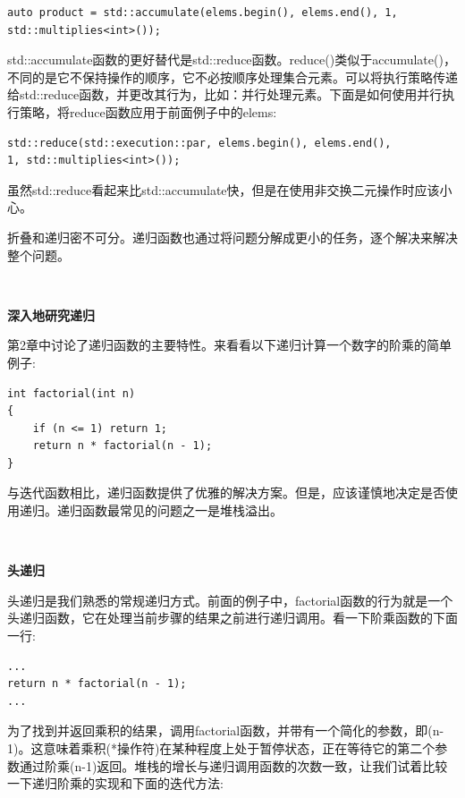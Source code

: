 \begin{lstlisting}[caption={}]
auto product = std::accumulate(elems.begin(), elems.end(), 1, std::multiplies<int>());
\end{lstlisting}

std::accumulate函数的更好替代是std::reduce函数。reduce()类似于accumulate()，不同的是它不保持操作的顺序，它不必按顺序处理集合元素。可以将执行策略传递给std::reduce函数，并更改其行为，比如：并行处理元素。下面是如何使用并行执行策略，将reduce函数应用于前面例子中的elems: \par

\begin{lstlisting}[caption={}]
std::reduce(std::execution::par, elems.begin(), elems.end(),
1, std::multiplies<int>());
\end{lstlisting}

虽然std::reduce看起来比std::accumulate快，但是在使用非交换二元操作时应该小心。 \par
折叠和递归密不可分。递归函数也通过将问题分解成更小的任务，逐个解决来解决整个问题。 \par

\noindent\textbf{}\ \par
\textbf{深入地研究递归} \ \par
第2章中讨论了递归函数的主要特性。来看看以下递归计算一个数字的阶乘的简单例子: \par

\begin{lstlisting}[caption={}]
int factorial(int n)
{
	if (n <= 1) return 1;
	return n * factorial(n - 1);
}
\end{lstlisting}

与迭代函数相比，递归函数提供了优雅的解决方案。但是，应该谨慎地决定是否使用递归。递归函数最常见的问题之一是堆栈溢出。 \par

\noindent\textbf{}\ \par
\textbf{头递归} \ \par
头递归是我们熟悉的常规递归方式。前面的例子中，factorial函数的行为就是一个头递归函数，它在处理当前步骤的结果之前进行递归调用。看一下阶乘函数的下面一行: \par

\begin{lstlisting}[caption={}]
...
return n * factorial(n - 1);
...
\end{lstlisting}

为了找到并返回乘积的结果，调用factorial函数，并带有一个简化的参数，即(n-1)。这意味着乘积(*操作符)在某种程度上处于暂停状态，正在等待它的第二个参数通过阶乘(n-1)返回。堆栈的增长与递归调用函数的次数一致，让我们试着比较一下递归阶乘的实现和下面的迭代方法: \par


